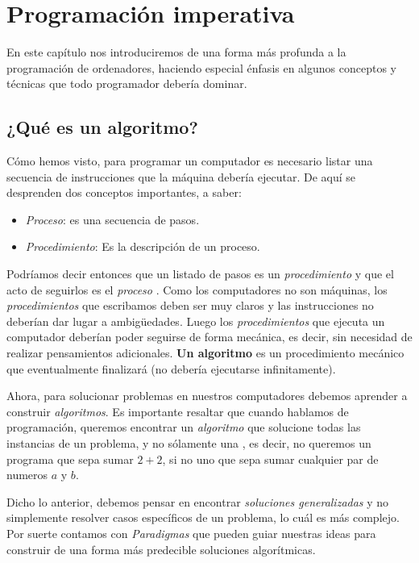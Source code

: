 \chapter{Programación imperativa}
 
En este capítulo nos introduciremos de una forma más profunda a la programación de ordenadores, haciendo especial énfasis en algunos conceptos y técnicas que todo programador debería dominar.

\section{¿Qué es un algoritmo?}

Cómo hemos visto, para programar un computador es necesario listar una secuencia de instrucciones que la máquina debería ejecutar. De aquí se desprenden dos conceptos importantes, a saber:

\begin{itemize}
	\item \emph{Proceso}: es una secuencia de pasos.
	\item \emph{Procedimiento}: Es la descripción de un proceso. 
\end{itemize}

Podríamos decir entonces que un listado de pasos es un \emph{procedimiento} y que el acto de seguirlos es el \emph{proceso} \cite[p.~2]{evansIntro}. Como los computadores no son máquinas, los \emph{procedimientos} que escribamos deben ser muy claros y las instrucciones no deberían dar lugar a ambigüedades. Luego los \emph{procedimientos} que ejecuta un computador deberían poder seguirse de forma mecánica, es decir, sin necesidad de realizar pensamientos adicionales. \textbf{Un algoritmo} es un procedimiento mecánico que eventualmente finalizará (no debería ejecutarse infinitamente).

Ahora, para solucionar problemas en nuestros computadores debemos aprender a construir \emph{algoritmos}. Es importante resaltar que cuando hablamos de programación, queremos encontrar un \emph{algoritmo} que solucione todas las instancias de un problema, y no sólamente una \cite[p.~53]{evansIntro}, es decir, no queremos un programa que sepa sumar $2+2$, si no uno que sepa sumar cualquier par de numeros $a$ y $b$. 

Dicho lo anterior, debemos pensar en encontrar \emph{soluciones generalizadas} y no simplemente resolver casos específicos de un problema, lo cuál es más complejo. Por suerte contamos con \emph{Paradigmas} que pueden guiar nuestras ideas para construir de una forma más predecible soluciones algorítmicas.

